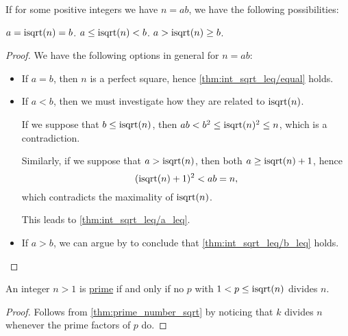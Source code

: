 \begin{proposition}\label{thm:int_sqrt_leq}
  If for some positive integers we have \( n = ab \), we have the following possibilities:
  \begin{thmenum}
     \( a = \op{isqrt}(n) = b \).
     \( a \leq \op{isqrt}(n) < b \).
     \( a > \op{isqrt}(n) \geq b \).
  \end{thmenum}
\end{proposition}
\begin{proof}
  We have the following options in general for \( n = ab \):
  \begin{itemize}
    \item If \( a = b \), then \( n \) is a perfect square, hence \cref{thm:int_sqrt_leq/equal} holds.
    \item If \( a < b \), then we must investigate how they are related to \( \op{isqrt}(n) \).

    If we suppose that \( b \leq \op{isqrt}(n) \), then \( ab < b^2 \leq \op{isqrt}(n)^2 \leq n \), which is a contradiction.

    Similarly, if we suppose that \( a > \op{isqrt}(n) \), then both \( a \geq \op{isqrt}(n) + 1 \), hence
    \begin{equation*}
      (\op{isqrt}(n) + 1)^2 < ab = n,
    \end{equation*}
    which contradicts the maximality of \( \op{isqrt}(n) \).

    This leads to \cref{thm:int_sqrt_leq/a_leq}.

    \item If \( a > b \), we can argue by  to conclude that \cref{thm:int_sqrt_leq/b_leq} holds.
  \end{itemize}
\end{proof}

\begin{corollary}\label{thm:prime_number_sqrt_prime}
  An integer \( n > 1 \) is \hyperref[def:prime_number]{prime} if and only if no  \( p \) with \( 1 < p \leq \op{isqrt}(n) \) divides \( n \).
\end{corollary}
\begin{proof}
  Follows from \cref{thm:prime_number_sqrt} by noticing that \( k \) divides \( n \) whenever the prime factors of \( p \) do.
\end{proof}

